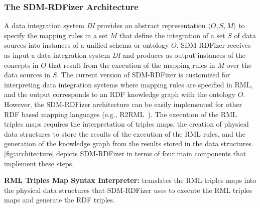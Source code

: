 \subsubsection{The SDM-RDFizer Architecture}
A data integration system \textit{DI} provides an abstract representation $\langle O,S,M\rangle$ to specify the mapping rules in a set $M$ that define the integration of a set $S$ of data sources into instances of a unified schema or ontology $O$. 
SDM-RDFizer receives as input a data integration system \textit{DI} and produces as output instances of the concepts in $O$ that result from the execution of the mapping rules in $M$ over the data sources in $S$. 
The current version of SDM-RDFizer is customized for interpreting data integration systems where mapping rules are specified in RML, and the output corresponds to an RDF knowledge graph with the ontology $O$. 
However, the SDM-RDFizer architecture can be easily implemented for other RDF based mapping languages (e.g., R2RML~\citep{R2RML}).  
The execution of the RML triples maps requires the interpretation of triples maps, the creation of physical data structures to store the results of the execution of the RML rules, and the generation of the knowledge graph from the results stored in the data structures. \autoref{fig:architecture} depicts SDM-RDFizer in terms of four main components that implement these steps. 

\noindent\textbf{RML Triples Map Syntax Interpreter:} translates the RML triples maps into the physical data structures that SDM-RDFizer uses to execute the RML triples maps and generate the RDF triples.

